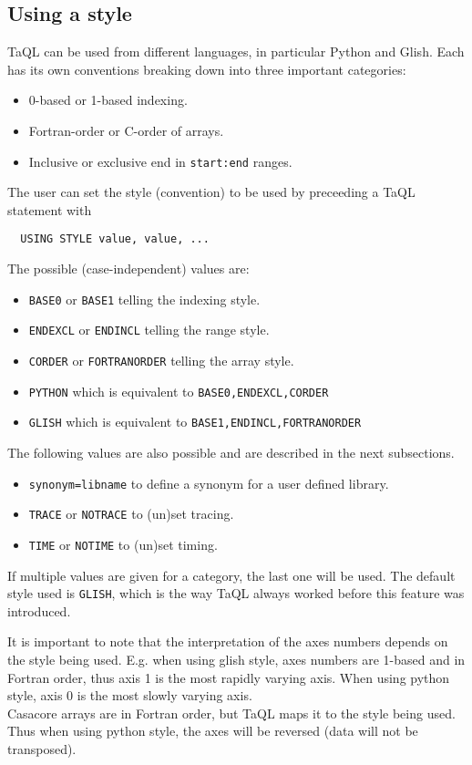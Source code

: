 \subsection{\label{TAQL:USINGSTYLE}Using a style}
TaQL can be used from different languages, in particular Python and
Glish. Each has its own conventions breaking down into three important
categories: 
\begin{itemize}
\item 0-based or 1-based indexing.
\item Fortran-order or C-order of arrays.
\item Inclusive or exclusive end in \texttt{start:end} ranges.
\end{itemize}
The user can set the style (convention) to be used by preceeding a
TaQL statement with
\begin{verbatim}
  USING STYLE value, value, ...
\end{verbatim}
The possible (case-independent) values are:
\begin{itemize}
\item \texttt{BASE0} or \texttt{BASE1} telling the indexing style.
\item \texttt{ENDEXCL} or \texttt{ENDINCL} telling the range style.
\item \texttt{CORDER} or \texttt{FORTRANORDER} telling the array style.
\item \texttt{PYTHON} which is equivalent to \texttt{BASE0,ENDEXCL,CORDER}
\item \texttt{GLISH} which is equivalent to \texttt{BASE1,ENDINCL,FORTRANORDER}
\end{itemize}
The following values are also possible and are described in the next subsections.
\begin{itemize}
\item \texttt{synonym=libname} to define a synonym for a user defined
  library.
\item \texttt{TRACE} or \texttt{NOTRACE} to (un)set tracing.
\item \texttt{TIME} or \texttt{NOTIME} to (un)set timing.
\end{itemize}
If multiple values are given for a category, the last one will be used.
The default style used is \texttt{GLISH}, which is the way TaQL always
worked before this feature was introduced.

It is important to note that the interpretation of the axes numbers
depends on the style being used. E.g. when using glish style, axes numbers are
1-based and in Fortran order, thus axis 1 is the most rapidly varying
axis. When using python style, axis 0 is the most slowly varying axis.
\\Casacore arrays are in Fortran order, but TaQL maps it to the
style being used. Thus when using python style, the axes will be
reversed (data will not be transposed).

